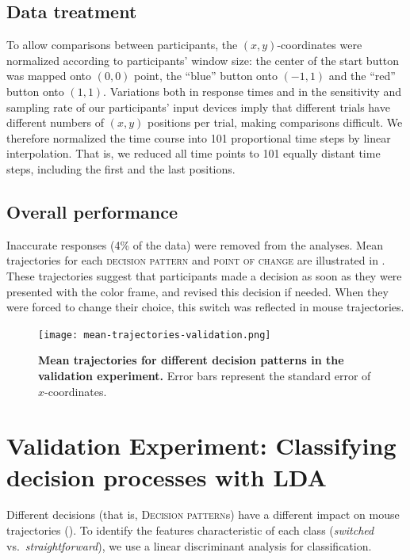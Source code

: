 \documentclass[11pt]{article}
\begin{document}
\subsection{Data treatment}
To allow comparisons between participants, the $(x,y)$-coordinates were normalized according to participants' window size: the center of the start button was mapped onto $(0,0)$ point, the ``blue'' button onto $(-1,1)$ and the ``red'' button onto $(1,1)$. 
Variations both in response times and in the sensitivity and sampling rate of our participants' input devices imply that different trials have different numbers of $(x,y)$ positions per trial, making comparisons difficult. %
We therefore normalized the time course into 101 proportional time steps by linear interpolation. That is, we reduced all time points to 101 equally distant time steps, including the first and the last positions.

\subsection{Overall performance}
Inaccurate responses (4\% of the data) were removed from the analyses. 
Mean trajectories for each \textsc{decision pattern} and \textsc{point of change} are illustrated in . 
These trajectories suggest that participants made a decision as soon as they were presented with the color frame, and revised this decision if needed. When they were forced to change their choice, this switch was reflected in mouse trajectories. 

\begin{figure}
\centering
\texttt{[image: mean-trajectories-validation.png]}
\caption{\textbf{Mean trajectories for different decision patterns in the validation experiment.} Error bars represent the standard error of $x$-coordinates.}\label{fig:mean.trajectories.calibration}
\end{figure}

\section{Validation Experiment: Classifying decision processes with LDA}
\label{section:LDA}
Different decisions (that is, \textsc{Decision pattern}s) have a different impact on mouse trajectories (). To identify the features characteristic of each class (\textit{switched} vs.\ \textit{straightforward}), we use a linear discriminant analysis for classification. 
\end{document}
